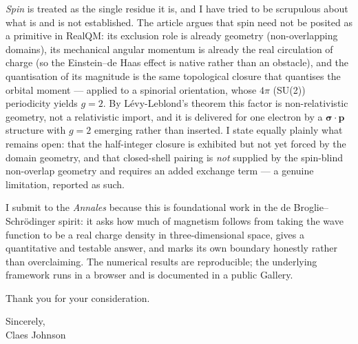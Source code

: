 \documentclass[11pt]{article}
\begin{document}
\emph{Spin} is treated as the single residue it is, and I have tried to be
scrupulous about what is and is not established. The article argues that spin
need not be posited as a primitive in RealQM: its exclusion role is already
geometry (non-overlapping domains), its mechanical angular momentum is already
the real circulation of charge (so the Einstein--de Haas effect is native
rather than an obstacle), and the quantisation of its magnitude is the same
topological closure that quantises the orbital moment --- applied to a spinorial
orientation, whose $4\pi$ (SU(2)) periodicity yields $g=2$. By Lévy-Leblond's
theorem this factor is non-relativistic geometry, not a relativistic import, and
it is delivered for one electron by a $\boldsymbol\sigma\cdot\mathbf{p}$
structure with $g=2$ emerging rather than inserted. I state equally plainly what
remains open: that the half-integer closure is exhibited but not yet forced by
the domain geometry, and that closed-shell pairing is \emph{not} supplied by the
spin-blind non-overlap geometry and requires an added exchange term --- a genuine
limitation, reported as such.

I submit to the \emph{Annales} because this is foundational work in the de
Broglie--Schr\"odinger spirit: it asks how much of magnetism follows from taking
the wave function to be a real charge density in three-dimensional space, gives
a quantitative and testable answer, and marks its own boundary honestly rather
than overclaiming. The numerical results are reproducible; the underlying
framework runs in a browser and is documented in a public Gallery.

\medskip

\noindent Thank you for your consideration.

\vspace{1em}

\noindent Sincerely, \\
Claes Johnson
\end{document}
